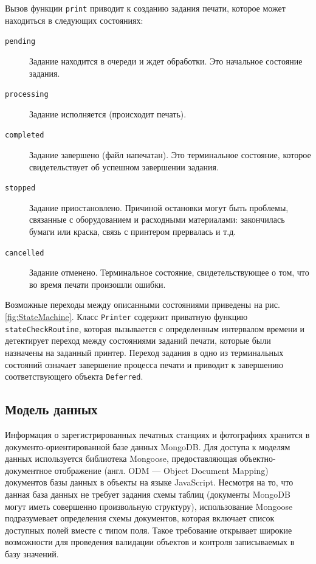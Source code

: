 \documentclass[a4paper,14pt,href,draft]{article}
\begin{document}
Вызов функции \texttt{print} приводит к созданию задания печати, которое может находиться в следующих состояниях:
\begin{description}
  \item[\texttt{pending}] Задание находится в очереди и ждет обработки. Это начальное состояние задания.
  \item[\texttt{processing}] Задание исполняется (происходит печать).
  \item[\texttt{completed}] Задание завершено (файл напечатан). Это терминальное состояние, которое свидетельствует
  об успешном завершении задания.
  \item[\texttt{stopped}] Задание приостановлено. Причиной остановки могут быть проблемы, связанные с оборудованием и
  расходными материалами: закончилась бумаги или краска, связь с принтером прервалась и т.д.
  \item[\texttt{cancelled}] Задание отменено. Терминальное состояние, свидетельствующее о том, что во время печати
  произошли ошибки.
\end{description}

Возможные переходы между описанными состояниями приведены на рис. \ref{fig:StateMachine}. Класс \texttt{Printer} содержит
приватную функцию \texttt{stateCheckRou\-ti\-ne}, которая вызывается с определенным интервалом времени и детектирует
переход между состояниями заданий печати, которые были назначены на заданный принтер. Переход задания в одно из терминальных
состояний означает завершение процесса печати и приводит к завершению соответствующего объекта \texttt{Deferred}.

\subsection{Модель данных}
Информация о зарегистрированных печатных станциях и фотографиях хранится в документо-ориентированной базе данных MongoDB.
Для доступа к моделям данных используется библиотека Mongoose\cite{Mongoose}, предоставляющая объектно-документное отображение
(англ. ODM \- --- Object Document Mapping) документов базы данных в объекты на языке JavaScript. Несмотря на то, что данная
база данных не требует задания схемы таблиц (документы MongoDB могут иметь совершенно произвольную структуру), использование
Mongoose подразумевает определения схемы документов, которая включает список доступных полей вместе с типом поля. Такое
требование открывает широкие возможности для проведения валидации объектов и контроля записываемых в базу значений.
\end{document}
